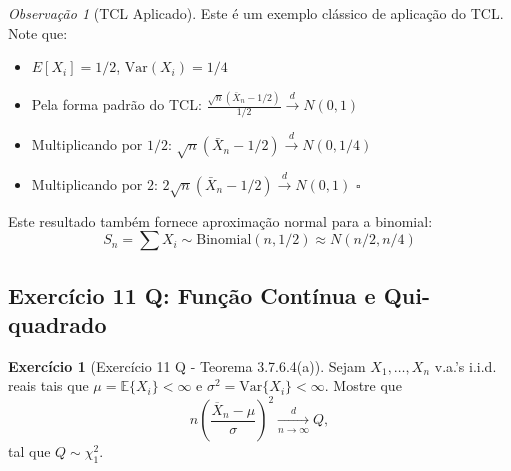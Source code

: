 \documentclass[12pt,a4paper]{article}
\theoremstyle{definition}
\newtheorem{exercicio}{Exercício}[section]
\theoremstyle{remark}
\newtheorem{observacao}{Observação}[section]
\begin{document}
\begin{observacao}[TCL Aplicado]
Este é um exemplo clássico de aplicação do TCL. Note que:
\begin{itemize}
    \item $E[X_i] = 1/2$, $\text{Var}(X_i) = 1/4$
    \item Pela forma padrão do TCL: $\frac{\sqrt{n}(\bar{X}_n - 1/2)}{1/2} \xrightarrow{d} N(0,1)$
    \item Multiplicando por $1/2$: $\sqrt{n}(\bar{X}_n - 1/2) \xrightarrow{d} N(0, 1/4)$
    \item Multiplicando por $2$: $2\sqrt{n}(\bar{X}_n - 1/2) \xrightarrow{d} N(0,1)$ $\square$
\end{itemize}

Este resultado também fornece aproximação normal para a binomial: 
\[
S_n = \sum X_i \sim \text{Binomial}(n, 1/2) \approx N(n/2, n/4)
\]
\end{observacao}

\subsection{Exercício 11 Q: Função Contínua e Qui-quadrado}

\begin{exercicio}[Exercício 11 Q - Teorema 3.7.6.4(a)]
Sejam $X_1, \ldots, X_n$ v.a.'s i.i.d. reais tais que $\mu = \mathbb{E}\{X_i\} < \infty$ e $\sigma^2 = \mathrm{Var}\{X_i\} < \infty$. Mostre que
\[
n \left( \frac{\overline{X}_n - \mu}{\sigma} \right)^2 \xrightarrow[n \to \infty]{d} Q,
\]
tal que $Q \sim \chi^2_1$.
\end{exercicio}
\end{document}
